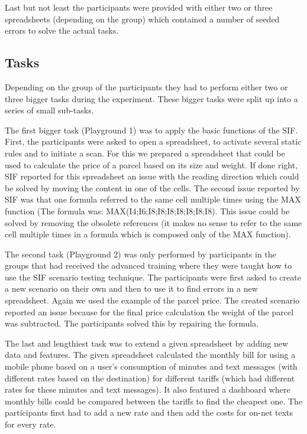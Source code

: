 Last but not least the participants were provided with either two or three spreadsheets (depending on the group) which contained a number of seeded errors to solve the actual tasks.




\subsection{Tasks} 
\label{subsec:tasks}
Depending on the group of the participants they had to perform either two or three bigger tasks during the experiment. These bigger tasks were split up into a series of small sub-tasks. 



The first bigger task (Playground 1) was to apply the basic functions of the SIF. First, the participants were asked to open a spreadsheet, to activate several static rules and to initiate a scan. For this we prepared a spreadsheet that could be used to calculate the price of a parcel based on its size and weight. If done right, SIF reported for this spreadsheet an issue with the reading direction which could be solved by moving the content in one of the cells. The second issue reported by SIF was that one formula referred to the same cell multiple times using the MAX function (The formula was: MAX(I4;I6;I8;I8;I8;I8;I8;I8;I8). This issue could be solved by removing the obsolete references (it makes no sense to refer to the same cell multiple times in a formula which is composed only of the MAX function).

The second task (Playground 2) was only performed by participants in the groups that had received the advanced training where they were taught how to use the SIF scenario testing technique. The participants were first asked to create a new scenario on their own and then to use it to find errors in a new spreadsheet. Again we used the example of the parcel price. The created scenario reported an issue because for the final price calculation the weight of the parcel was subtracted. The participants solved this by repairing the formula. 

The last and lengthiest task was to extend a given spreadsheet by adding new data and features. The given spreadsheet calculated the monthly bill for using a mobile phone based on a user's consumption of minutes and text messages (with different rates based on the destination) for different tariffs (which had different rates for these minutes and text messages). It also featured a dashboard where monthly bills could be compared between the tariffs to find the cheapest one. The participants first had to add a new rate and then add the costs for on-net texts for every rate. 



